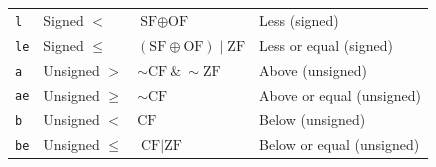 \begin{definition}
\begin{center}
\begin{tabular}{|l|l|l|l|}
            \texttt{l} & Signed $<$ & $\text{SF} \oplus \text{OF}$ & Less (signed) \\
            \texttt{le} & Signed $\le$ & $(\text{SF} \oplus \text{OF}) \mid \text{ZF}$ & Less or equal (signed) \\
            \hline
            \texttt{a} & Unsigned $>$ & $\sim\text{CF} \ \& \ \sim\text{ZF}$ & Above (unsigned) \\
            \texttt{ae} & Unsigned $\ge$ & $\sim\text{CF}$ & Above or equal (unsigned) \\
            \texttt{b} & Unsigned $<$ & $\text{CF}$ & Below (unsigned) \\
            \texttt{be} & Unsigned $\le$ & $\text{CF} \mid \text{ZF}$ & Below or equal (unsigned) \\
            \hline
        \end{tabular}
    \end{center}
\end{definition}
